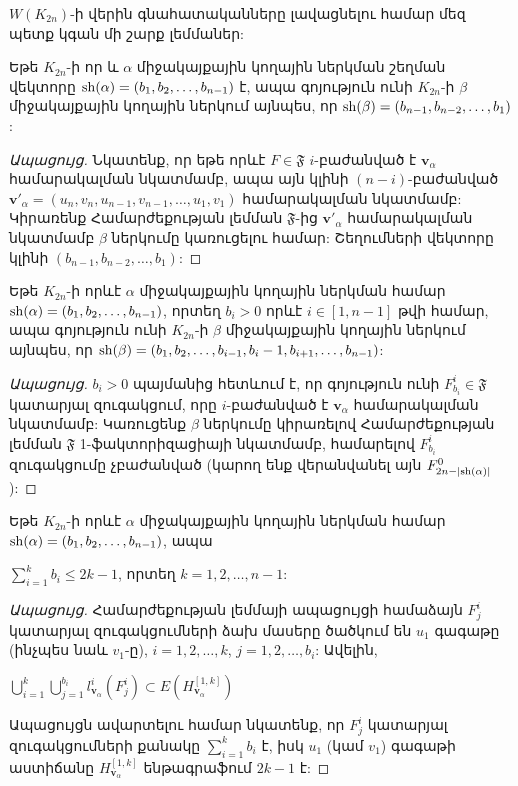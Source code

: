 $W(K_{2n})$-ի վերին գնահատականները լավացնելու համար մեզ պետք կգան մի շարք լեմմաներ:

\begin{lemma}
\label{lReverse}
Եթե $K_{2n}$-ի որ և $\alpha$ միջակայքային կողային ներկման շեղման վեկտորը ${\rm sh}(\alpha) = (b_1,b_2,\ldots, b_{n-1})$ է, ապա գոյություն ունի $K_{2n}$-ի $\beta$ միջակայքային կողային ներկում այնպես, որ ${\rm sh}(\beta) = (b_{n-1}, b_{n-2}, \ldots, b_1)$:
\end{lemma}
\begin{proof}[Ապացույց]
Նկատենք, որ եթե որևէ $F \in \mathfrak{F}$ $i$-բաժանված է $\mathbf{v}_\alpha$ համարակալման նկատմամբ, ապա այն կլինի $(n-i)$-բաժանված $\mathbf{v}'_\alpha = \left(u_n,v_n,u_{n-1},v_{n-1},\ldots,u_1,v_1\right)$ համարակալման նկատմամբ: 
Կիրառենք Համարժեքության լեմման $\mathfrak{F}$-ից $\mathbf{v}'_\alpha$ համարակալման նկատմամբ $\beta$ ներկումը կառուցելու համար: Շեղումների վեկտորը կլինի $(b_{n-1}, b_{n-2}, \ldots, b_1)$:
\end{proof}

\begin{lemma}
\label{lLessColors}
Եթե $K_{2n}$-ի որևէ $\alpha$ միջակայքային կողային ներկման համար ${\rm sh}(\alpha) = (b_1,b_2,\ldots, b_{n-1})$, որտեղ $b_i > 0$ որևէ $i \in [1,n-1]$ թվի համար, ապա գոյություն ունի $K_{2n}$-ի $\beta$ միջակայքային կողային ներկում այնպես, որ ${\rm sh}(\beta) = (b_1, b_2, \ldots, b_{i-1}, b_{i}-1, b_{i+1}, \ldots, b_{n-1})$:
\end{lemma}
\begin{proof}[Ապացույց]
$b_i > 0$ պայմանից հետևում է, որ գոյություն ունի $F_{b_i}^i \in \mathfrak{F}$ կատարյալ զուգակցում, որը $i$-բաժանված է $\mathbf{v}_\alpha$ համարակալման նկատմամբ: Կառուցենք $\beta$ ներկումը կիրառելով Համարժեքության լեմման $\mathfrak{F}$ 1-ֆակտորիզացիայի նկատմամբ, համարելով $F_{b_i}^i$ զուգակցումը չբաժանված (կարող ենք վերանվանել այն $F^0_{2n-|{\rm sh}(\alpha)|}$):
\end{proof}


\begin{lemma}
\label{l2k1}
Եթե $K_{2n}$-ի որևէ $\alpha$ միջակայքային կողային ներկման համար ${\rm sh}(\alpha) = (b_1,b_2,\ldots, b_{n-1})$, ապա
\begin{center}
$\sum\limits_{i=1}^{k}{b_i} \leq 2k-1$, որտեղ $k=1,2,\ldots,n-1$:
\end{center}
\end{lemma}

\begin{proof}[Ապացույց]
Համարժեքության լեմմայի ապացույցի համաձայն $F^i_j$ կատարյալ զուգակցումների ձախ մասերը ծածկում են $u_1$ գագաթը (ինչպես նաև $v_1$-ը), $i=1,2,\ldots,k$, $j=1,2,\ldots,b_i$: Ավելին, 
\begin{center}
$\bigcup\limits_{i=1}^{k}
\bigcup\limits_{j=1}^{b_i}
{l^i_{\mathbf{v}_\alpha}\left(F^i_j\right)} 
\subset E\left(H_{\mathbf{v}_\alpha}^{[1,k]}\right)$
\end{center}
Ապացույցն ավարտելու համար նկատենք, որ $F^i_j$ կատարյալ զուգակցումների քանակը $\sum\limits_{i=1}^{k}{b_i}$ է, իսկ $u_1$ (կամ $v_1$) գագաթի աստիճանը $H_{\mathbf{v}_\alpha}^{[1,k]}$ ենթագրաֆում $2k-1$ է:
\end{proof}

